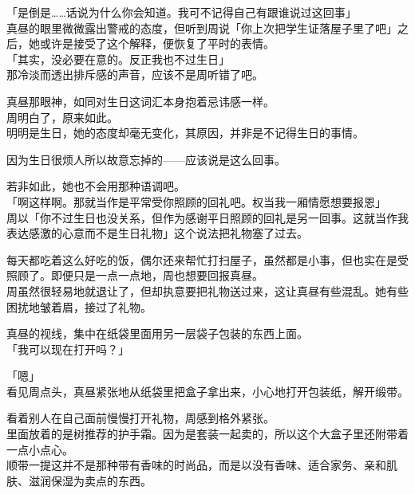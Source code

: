 「是倒是……话说为什么你会知道。我可不记得自己有跟谁说过这回事」\\

真昼的眼里微微露出警戒的态度，但听到周说「你上次把学生证落屋子里了吧」之后，她或许是接受了这个解释，便恢复了平时的表情。\\

「其实，没必要在意的。反正我也不过生日」\\

那冷淡而透出排斥感的声音，应该不是周听错了吧。

真昼那眼神，如同对生日这词汇本身抱着忌讳感一样。\\

周明白了，原来如此。\\

明明是生日，她的态度却毫无变化，其原因，并非是不记得生日的事情。

因为生日很烦人所以故意忘掉的——应该说是这么回事。

若非如此，她也不会用那种语调吧。\\

「啊这样啊。那就当作是平常受你照顾的回礼吧。权当我一厢情愿想要报恩」\\

周以「你不过生日也没关系，但作为感谢平日照顾的回礼是另一回事。这就当作我表达感激的心意而不是生日礼物」这个说法把礼物塞了过去。

每天都吃着这么好吃的饭，偶尔还来帮忙打扫屋子，虽然都是小事，但也实在是受照顾了。即便只是一点一点地，周也想要回报真昼。\\

周虽然很轻易地就退让了，但却执意要把礼物送过来，这让真昼有些混乱。她有些困扰地皱着眉，接过了礼物。

真昼的视线，集中在纸袋里面用另一层袋子包装的东西上面。\\

「我可以现在打开吗？」

「嗯」\\

看见周点头，真昼紧张地从纸袋里把盒子拿出来，小心地打开包装纸，解开缎带。

看着别人在自己面前慢慢打开礼物，周感到格外紧张。\\

里面放着的是树推荐的护手霜。因为是套装一起卖的，所以这个大盒子里还附带着一点小点心。\\

顺带一提这并不是那种带有香味的时尚品，而是以没有香味、适合家务、亲和肌肤、滋润保湿为卖点的东西。

